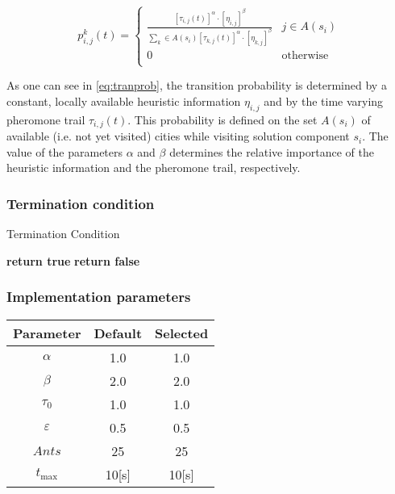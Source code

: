\begin{homeworkProblem}
\begin{equation} 
p_{i,j}^k(t) = \begin{cases}
  \frac{[\tau_{i,j}(t)]^\alpha \cdot [\eta_{i,j}]^\beta}{\sum_{k} \in A(s_{i}) [\tau_{k,j}(t)]^\alpha \cdot [\eta_{k,j}]^\beta} & j \in A(s_{i}) \\
 0 & \text{otherwise} \\
\end{cases}
\end{equation}

As one can see in \ref{eq:tranprob}, the transition probability is determined by a constant, locally available heuristic information $\eta_{i,j}$ and by the time varying pheromone trail $\tau_{i,j}(t)$.
This probability is defined on the set $A(s_i)$ of available (i.e. not yet visited) cities while visiting solution component $s_i$.
The value of the parameters $\alpha$ and $\beta$ determines the relative importance of the heuristic information and the pheromone trail, respectively.

\subsubsection{Termination condition}
\begin{algorithm}[!h]
  \caption{Termination Condition}\label{termcond}
  \begin{algorithmic}[1]
				    \State \textbf{return true}
			    \EndIf
      \State \textbf{return false}
    \EndProcedure
\end{algorithmic}
\end{algorithm}

\subsubsection{Implementation parameters}
\begin{center}
\begin{tabular}{|c|c|c|}
\hline
\textbf{Parameter} & \textbf{Default} & \textbf{Selected} \\ \hline 
$\alpha$ & 1.0 & 1.0 \\\hline
$\beta$ & 2.0 & 2.0 \\\hline 
$\tau_0$ & 1.0 & 1.0 \\ \hline
$\varepsilon$ & 0.5 & 0.5 \\ \hline 
$Ants$ & 25 & 25 \\ \hline  
$t_{\max}$ & 10[s] & 10[s] \\ \hline
\end{tabular}
\label{saParameters}
\end{center}

 
\end{homeworkProblem}
